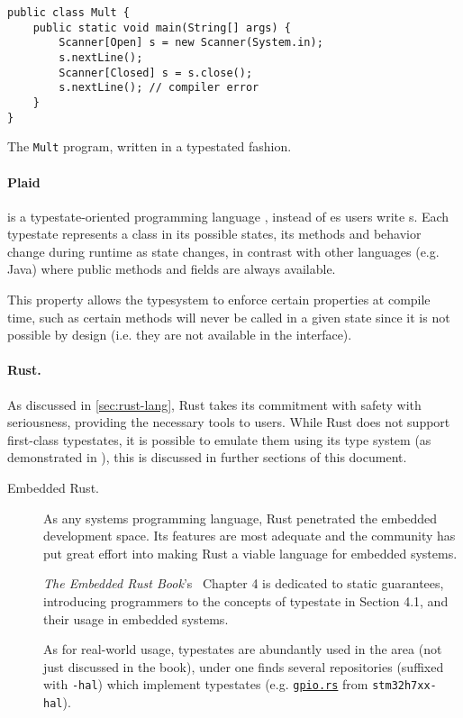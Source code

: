 \begin{listing}
    \centering
    \begin{verbatim}
public class Mult {
    public static void main(String[] args) {
        Scanner[Open] s = new Scanner(System.in);
        s.nextLine();
        Scanner[Closed] s = s.close();
        s.nextLine(); // compiler error
    }
}
    \end{verbatim}
    \caption{The \texttt{Mult} program, written in a typestated fashion.}
    \label{lst:java-mult-typestate}
\end{listing}

\paragraph{Plaid} is a typestate-oriented programming language \autocite{Aldrich2009},
instead of es users write s.
Each typestate represents a class in its possible states,
its methods and behavior change during runtime as state changes,
in contrast with other languages (e.g. Java) where public methods and fields are always available.

This property allows the typesystem to enforce certain properties at compile time,
such as certain methods will never be called in a given state since it is not possible by design
(i.e. they are not available in the interface).


\paragraph{Rust.}
As discussed in \autoref{sec:rust-lang}, Rust takes its commitment with safety with seriousness,
providing the necessary tools to users.
While Rust does not support first-class typestates,
it is possible to emulate them using its type system (as demonstrated in \autocite{Duarte2020}),
this is discussed in further sections of this document.

\begin{description}
    \item[Embedded Rust.] As any systems programming language, Rust penetrated the embedded development space.
          Its features are most adequate and the community has put great effort into making Rust a viable language for embedded systems.

          \emph{The Embedded Rust Book}'s~\autocite{Rust2021} Chapter 4 is dedicated to static guarantees,
          introducing programmers to the concepts of typestate in Section 4.1, and their usage in embedded systems.

          As for real-world usage, typestates are abundantly used in the area (not just discussed in the book),
          under \autocite{Stm32} one finds several repositories (suffixed with \texttt{-hal})
          which implement typestates
          (e.g. \href{https://github.com/stm32-rs/stm32h7xx-hal/blob/master/src/gpio.rs#L51-L128}{\texttt{gpio.rs}}
          from \texttt{stm32h7xx-hal}).
\end{description}

